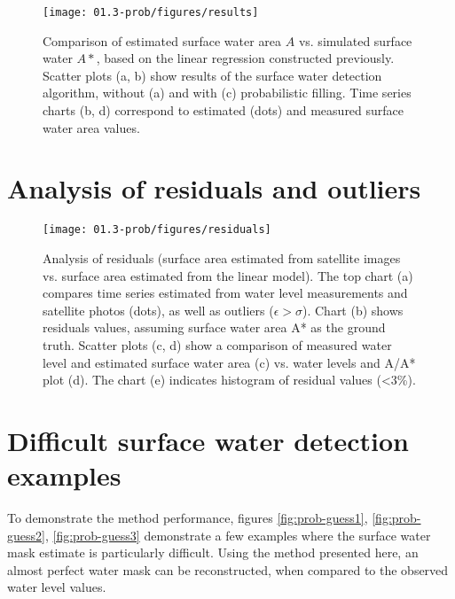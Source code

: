 \begin{figure}[H]
	\centering
	\texttt{[image: 01.3-prob/figures/results]}
	\caption{Comparison of estimated surface water area $A$ vs. simulated surface water $A*$, based on the linear regression constructed previously. Scatter plots (a, b) show results of the surface water detection algorithm, without (a) and with (c) probabilistic filling. Time series charts (b, d) correspond to estimated (dots) and measured surface water area values.}
	\label{fig:prob-results}
\end{figure}

\section{Analysis of residuals and outliers}

\begin{figure}[H]
	\centering
	\texttt{[image: 01.3-prob/figures/residuals]}
	\caption{Analysis of residuals (surface area estimated from satellite images vs. surface area estimated from the linear model). The top chart (a) compares time series estimated from water level measurements and satellite photos (dots), as well as outliers ($\epsilon > \sigma$). Chart (b) shows residuals values, assuming surface water area A* as the ground truth. Scatter plots (c, d) show a comparison of measured water level and estimated surface water area (c) vs. water levels and A/A* plot (d). The chart (e) indicates histogram of residual values (<3\%).}
	\label{fig:prob-results}
\end{figure}


\section{Difficult surface water detection examples}

To demonstrate the method performance, figures \ref{fig:prob-guess1}, \ref{fig:prob-guess2}, \ref{fig:prob-guess3} demonstrate a few examples where the surface water mask estimate is particularly difficult. Using the method presented here, an almost perfect water mask can be reconstructed, when compared to the observed water level values. 

